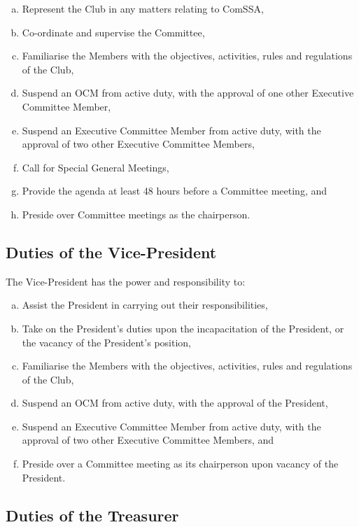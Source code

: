 \documentclass[a4paper,12pt]{article}
\begin{document}
\begin{enumerate}[a)]
	\item Represent the Club in any matters relating to ComSSA,
	\item Co-ordinate and supervise the Committee,
	\item Familiarise the Members with the objectives, activities, rules and regulations of the Club,
	\item Suspend an OCM from active duty, with the approval of one other Executive Committee Member,
	\item Suspend an Executive Committee Member from active duty, with the approval of two other Executive Committee Members,
	\item Call for Special General Meetings,
	\item Provide the agenda at least 48 hours before a Committee meeting, and
	\item Preside over Committee meetings as the chairperson.
\end{enumerate}

\subsection{Duties of the Vice-President}

The Vice-President has the power and responsibility to:

\begin{enumerate}[a)]
	\item Assist the President in carrying out their responsibilities,
	\item Take on the President's duties upon the incapacitation of the President, or the vacancy of the President's position,
	\item Familiarise the Members with the objectives, activities, rules and regulations of the Club,
	\item Suspend an OCM from active duty, with the approval of the President,
	\item Suspend an Executive Committee Member from active duty, with the approval of two other Executive Committee Members, and
	\item Preside over a Committee meeting as its chairperson upon vacancy of the President.
\end{enumerate}

\subsection{Duties of the Treasurer}
\end{document}

